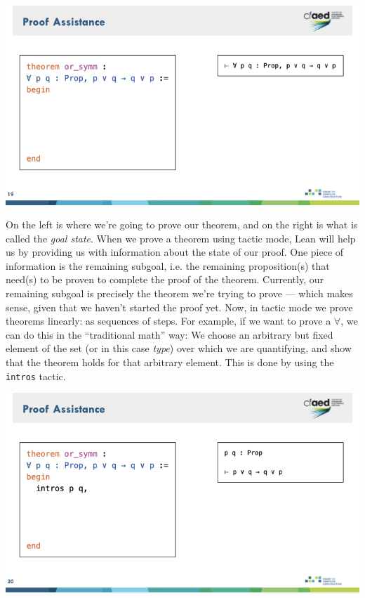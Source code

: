 \documentclass{article}
\begin{document}
\begin{center}
    \includegraphics[width=\columnwidth]{Slides/Slide 19.jpeg}
\end{center}

On the left is where we're going to prove our theorem, and on the right is what is called the \emph{goal state}.
When we prove a theorem using tactic mode, Lean will help us by providing us with information about the state of our proof.
One piece of information is the remaining subgoal, i.e. the remaining proposition(s) that need(s) to be proven to complete the proof of the theorem.
Currently, our remaining subgoal is precisely the theorem we're trying to prove --- which makes sense, given that we haven't started the proof yet.
Now, in tactic mode we prove theorems linearly: as sequences of steps.
For example, if we want to prove a $\forall$, we can do this in the ``traditional math'' way:
We choose an arbitrary but fixed element of the set (or in this case \emph{type}) over which we are quantifying, and show that the theorem holds for that arbitrary element.
This is done by using the \verb|intros| tactic.

\begin{center}
    \includegraphics[width=\columnwidth]{Slides/Slide 20.jpeg}
\end{center}
\end{document}
